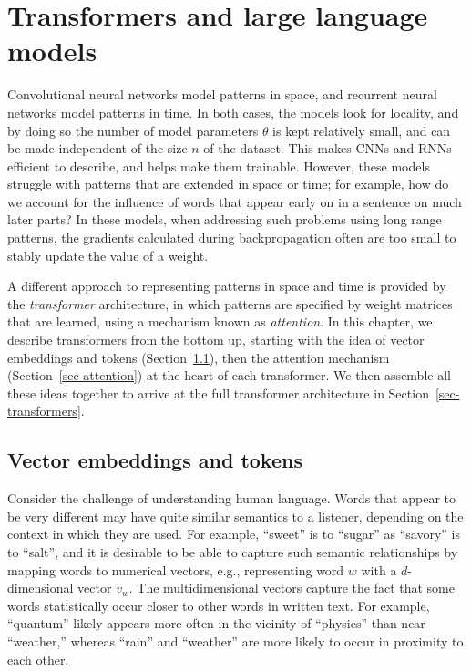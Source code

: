 \chapter{Transformers and large language models}
\label{chap-transformers}

Convolutional neural networks model patterns in space, and recurrent neural networks model patterns in time.  In both cases, the models look for locality, and by doing so the number of model parameters $\theta$ is kept relatively small, and can be made independent of the size $n$ of the dataset.  This makes CNNs and RNNs efficient to describe, and helps make them trainable.  However, these models struggle with patterns that are extended in space or time; for example, how do we account for the influence of words that appear early on in a sentence on much later parts?  In these models, when addressing such problems using long range patterns, the gradients calculated during backpropagation often are too small to stably update the value of a weight.

A different approach to representing patterns in space and time is provided by the {\em transformer} architecture, in which patterns are specified by weight matrices that are learned, using a mechanism known as {\em attention}.  In this chapter, we describe transformers from the bottom up, starting with the idea of vector embeddings and tokens (Section~\ref{sec-embeddings}), then the attention mechanism (Section~\ref{sec-attention}) at the heart of each transformer.  We then assemble all these ideas together to arrive at the full transformer architecture in Section~\ref{sec-transformers}.

\section{Vector embeddings and tokens}
\label{sec-embeddings}


Consider the challenge of understanding human language.  Words that appear to be very different may have quite similar semantics to a listener, depending on the context in which they are used.  For example, ``sweet'' is to ``sugar'' as ``savory'' is to ``salt'', and it is desirable to be able to capture such semantic relationships by mapping words to numerical vectors, e.g., representing word $w$ with a $d$-dimensional vector $v_w$.  The multidimensional vectors capture the fact that some words statistically occur closer to other words in written text.  For example, ``quantum'' likely appears more often in the vicinity of ``physics'' than near ``weather,'' whereas ``rain'' and ``weather'' are more likely to occur in proximity to each other.

